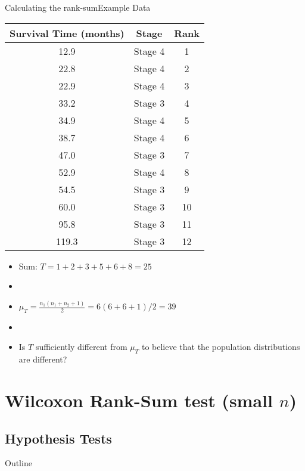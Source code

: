 \documentclass[xcolor=dvipsnames]{beamer}
\begin{document}
\begin{frame}{Calculating the rank-sum}{Example Data}
\begin{center}{\tiny
	\begin{tabular}{|c|c|c|}
		\hline
		\textbf{Survival Time (months)} &  \textbf{Stage} & \textbf{Rank}\\ \hline \hline
		12.9 &Stage 4 & 1 \\ \hline
		22.8 &Stage 4 & 2\\ \hline
		22.9& Stage 4 & 3\\ \hline
		33.2 &Stage 3 & 4\\ \hline
		34.9& Stage 4 & 5\\ \hline
		38.7 &Stage 4 & 6\\ \hline
		47.0 &Stage 3 & 7\\ \hline		
		52.9  &Stage 4 & 8\\ \hline
		54.5 &Stage 3 & 9\\ \hline				
		60.0 &Stage 3 & 10\\ \hline
		95.8& Stage 3 & 11\\ \hline
		119.3 &Stage 3 & 12\\ \hline
	\end{tabular}}
\end{center}
\begin{itemize}
	\item Sum: $T = 1 + 2 + 3 + 5 + 6 + 8 = 25$ \pause
	\item[]
	\item $\mu_T = \frac{n_1 (n_1 + n_2 + 1)}{2} = 6(6+6+1)/2 = 39$ \pause
	\item[]
	\item Is $T$ sufficiently different from $\mu_T$ to believe that the population distributions are different?
\end{itemize}
\end{frame}

\section{Wilcoxon Rank-Sum test (small $n$)}

\subsection{Hypothesis Tests}
\begin{frame}{Outline}
\tableofcontents[currentsection,subsectionstyle=show/shaded/hide]
\end{frame}
\end{document}

